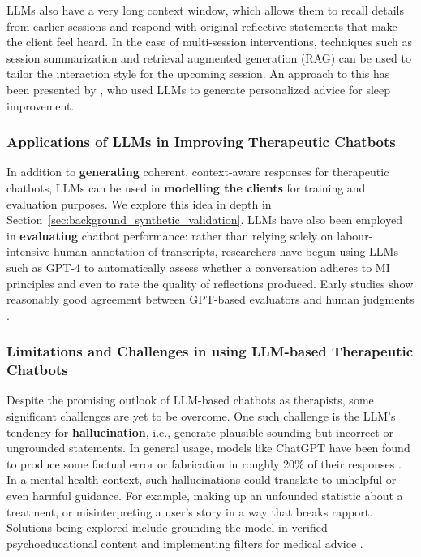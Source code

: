 LLMs also have a very long context window, which allows them to recall details from earlier sessions and respond with original reflective statements that make the client feel heard. In the case of multi-session interventions, techniques such as session summarization and retrieval augmented generation (RAG) can be used to tailor the interaction style for the upcoming session. An approach to this has been presented by \cite{corda2024context}, who used LLMs to generate personalized advice for sleep improvement.


\subsubsection{Applications of LLMs in Improving Therapeutic Chatbots}
In addition to \textbf{generating} coherent, context-aware responses for therapeutic chatbots, LLMs can be used in \textbf{modelling the clients} for training and evaluation purposes. We explore this idea in depth in Section~\ref{sec:background_synthetic_validation}. LLMs have also been employed in \textbf{evaluating} chatbot performance: rather than relying solely on labour-intensive human annotation of transcripts, researchers have begun using LLMs such as GPT-4 to automatically assess whether a conversation adheres to MI principles and even to rate the quality of reflections produced. Early studies show reasonably good agreement between GPT-based evaluators and human judgments \cite{Scholich2025}. 


\subsubsection{Limitations and Challenges in using LLM-based Therapeutic Chatbots}
Despite the promising outlook of LLM-based chatbots as therapists, some significant challenges are yet to be overcome. One such challenge is the LLM's tendency for \textbf{hallucination}, i.e., generate plausible-sounding but incorrect or ungrounded statements. In general usage, models like ChatGPT have been found to produce some factual error or fabrication in roughly 20\% of their responses \cite{Li2023}. In a mental health context, such hallucinations could translate to unhelpful or even harmful guidance. For example, making up an unfounded statistic about a treatment, or misinterpreting a user's story in a way that breaks rapport. Solutions being explored include grounding the model in verified psychoeducational content and implementing filters for medical advice \cite{Amugongo2025RAG}.


